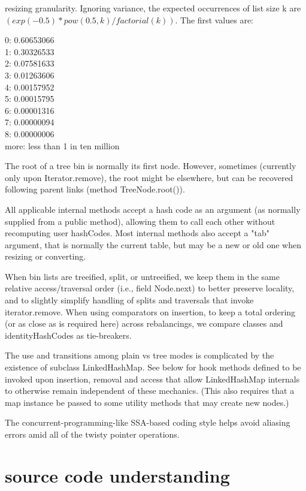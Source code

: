 \documentclass[UTF8,11pt]{ctexbook}
\begin{document}
	resizing granularity. Ignoring variance, the expected
	occurrences of list size k are $(exp(-0.5) * pow(0.5, k) /
	factorial(k))$. The first values are:
	\par 
	0:    0.60653066\\
	1:    0.30326533\\
	2:    0.07581633\\
	3:    0.01263606\\
	4:    0.00157952\\
	5:    0.00015795\\
	6:    0.00001316\\
	7:    0.00000094\\
	8:    0.00000006\\
	more: less than 1 in ten million
	\par
	
	The root of a tree bin is normally its first node.  However,
	sometimes (currently only upon Iterator.remove), the root might
	be elsewhere, but can be recovered following parent links
	(method TreeNode.root()).
	
	All applicable internal methods accept a hash code as an
	argument (as normally supplied from a public method), allowing
	them to call each other without recomputing user hashCodes.
	Most internal methods also accept a "tab" argument, that is
	normally the current table, but may be a new or old one when
	resizing or converting.
	
	When bin lists are treeified, split, or untreeified, we keep
	them in the same relative access/traversal order (i.e., field
	Node.next) to better preserve locality, and to slightly
	simplify handling of splits and traversals that invoke
	iterator.remove. When using comparators on insertion, to keep a
	total ordering (or as close as is required here) across
	rebalancings, we compare classes and identityHashCodes as
	tie-breakers.
	
	The use and transitions among plain vs tree modes is
	complicated by the existence of subclass LinkedHashMap. See
	below for hook methods defined to be invoked upon insertion,
	removal and access that allow LinkedHashMap internals to
	otherwise remain independent of these mechanics. (This also
	requires that a map instance be passed to some utility methods
	that may create new nodes.)
	
	The concurrent-programming-like SSA-based coding style helps
	avoid aliasing errors amid all of the twisty pointer operations.
	
\section{source code understanding}
	 
	
\end{document}
